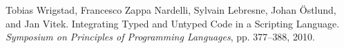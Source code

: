 \documentclass[screen=true, 10pt, acmsmall]{acmart}
\newcommand{\postDoc}{}
\newenvironment{SingleColumn}{\begin{list}{}{\topsep=0pt\partopsep=0pt%
\listparindent=0pt\itemindent=0pt\labelwidth=0pt\leftmargin=0pt\rightmargin=0pt%
\itemsep=0pt\parsep=0pt}\item}{\end{list}}
\newenvironment{AutoBibliography}{\begin{small}}{\end{small}}
\newcommand{\Autobibentry}[1]{\hspace{0.05\linewidth}\parbox[t]{0.95\linewidth}{\parindent=-0.05\linewidth#1\vspace{1.0ex}}}
\begin{document}
\begin{AutoBibliography}
\begin{SingleColumn}
\label{t:x28autobib_x22Tobias_Wrigstadx2c_Francesco_Zappa_Nardellix2c_Sylvain_Lebresnex2c_Johan_xd6stlundx2c_and_Jan_VitekIntegrating_Typed_and_Untyped_Code_in_a_Scripting_LanguageSymposium_on_Principles_of_Programming_Languagesx2c_ppx2e_377x2dx2d3882010x22x29}\Autobibentry{Tobias Wrigstad, Francesco Zappa Nardelli, Sylvain Lebresne, Johan \"{O}stlund, and Jan Vitek. Integrating Typed and Untyped Code in a Scripting Language. \textit{Symposium on Principles of Programming Languages}, pp. 377{--}388, 2010.}\end{SingleColumn}\end{AutoBibliography}

\postDoc
\end{document}
